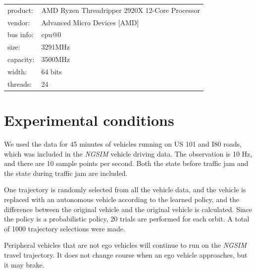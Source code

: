 \begin{tabular}{ll}
product:     & AMD Ryzen Threadripper 2920X 12-Core Processor \\
vendor:      & Advanced Micro Devices [AMD] \\
bus info:    & cpu@0 \\
size:        & 3291MHz \\
capacity:    & 3500MHz \\
width:       & 64 bits \\
threads:     & 24 \\
\end{tabular} 


\section{Experimental conditions}

We used the data for 45 minutes of vehicles running on US 101 and I80 roads, which was included in the {\it NGSIM} vehicle driving data.
The observation is 10 Hz, and there are 10 sample points per second.
Both the state before traffic jam and the state during traffic jam are included.


One trajectory is randomly selected from all the vehicle data, and the vehicle is replaced with an autonomous vehicle according to the learned policy, and the difference between the original vehicle and the original vehicle is calculated.
Since the policy is a probabilistic policy, 20 trials are performed for each orbit.
A total of 1000 trajectory selections were made.

Peripheral vehicles that are not ego vehicles will continue to run on the {\it NGSIM} travel trajectory. It does not change course when an ego vehicle approaches, but it may brake.


